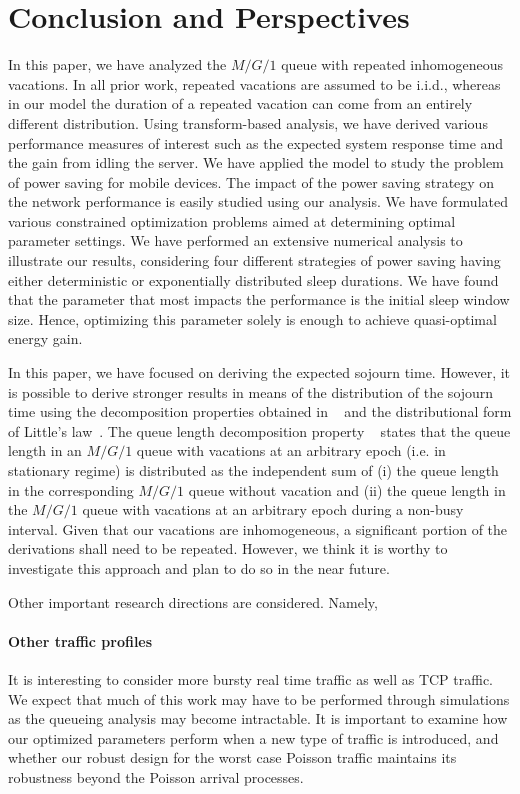 \documentclass[journal]{IEEEtran}
\begin{document}
\section{Conclusion and Perspectives}
\label{s:conc}
In this paper, we have analyzed the $M/G/1$ queue with repeated inhomogeneous vacations. In all prior work, repeated vacations are assumed to be i.i.d., whereas in our model the duration of a repeated vacation can come from an entirely different distribution. Using transform-based analysis, we have derived various performance measures of interest such as the expected system response time and the gain from idling the server. We have applied the model to study the problem of power saving for mobile devices. The impact of the power saving strategy on the network performance is easily studied using our analysis. We have formulated various constrained optimization problems aimed at determining optimal parameter settings. We have performed an extensive numerical analysis to illustrate our results, considering four different strategies of power saving having either deterministic or exponentially distributed sleep durations. We have found that the parameter that most impacts the performance is the initial sleep window size. Hence, optimizing this parameter solely is enough to achieve quasi-optimal energy gain.

In this paper, we have focused on deriving the expected sojourn time. However, it is possible to derive stronger results in means of the distribution of the sojourn time using the decomposition properties obtained in ~\cite{Fuhrmann_Copper_1985} and the distributional form of Little's law~\cite{KS83}. The queue length decomposition property ~\cite{Fuhrmann_Copper_1985} states that the queue length in an $M/G/1$ queue with vacations at an arbitrary epoch (i.e. in stationary regime) is distributed as the independent sum of (i) the queue length in the corresponding $M/G/1$ queue without vacation and (ii) the queue length in the $M/G/1$ queue with vacations at an arbitrary epoch during a non-busy interval. Given that our vacations are inhomogeneous, a significant portion of the derivations shall need to be repeated. However, we think it is worthy to investigate this approach and plan to do so in the near future. 

Other important research directions are considered. Namely,
\paragraph{Other traffic profiles}
It is interesting to consider more bursty real time traffic as well as TCP traffic. We expect that much of this work may have to be performed through simulations as the queueing analysis may become intractable. It is important to examine how our optimized parameters perform when a new type of traffic is introduced, and whether our robust design for the worst case Poisson traffic maintains its robustness beyond the Poisson arrival processes.
\end{document}
